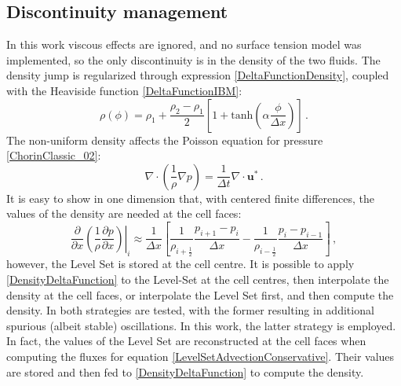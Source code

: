 \documentclass[11pt, a4paper, oneside, openany]{book}
\begin{document}
\subsection{Discontinuity management}
In this work viscous effects are ignored, and no surface tension model was implemented, so the only discontinuity is in the density of the two fluids. The density jump is regularized through expression \eqref{DeltaFunctionDensity}, coupled with the Heaviside function \eqref{DeltaFunctionIBM}:
\begin{equation}
\rho\left(\phi\right)=\rho_{1}+\dfrac{\rho_{2}-\rho_{1}}{2}\left[1+\mathrm{tanh}\left(\alpha\dfrac{\phi}{\Delta x}\right)\right]\,.\label{DensityDeltaFunction}
\end{equation}
The non-uniform density affects the Poisson equation for pressure \eqref{ChorinClassic_02}:
\begin{equation}
	\nabla\cdot\left(\dfrac{1}{\rho}\nabla p\right)=\frac{1}{\Delta t}\nabla\cdot\boldsymbol{u}^{*}\,.\label{PoissonPressureVarDensity}
\end{equation}
It is easy to show in one dimension that, with centered finite differences, the values of the density are needed at the cell faces:
\begin{equation*}
	\left.\dfrac{\partial}{\partial x}\left(\dfrac{1}{\rho}\dfrac{\partial p}{\partial x}\right)\right|_{i}\approx\dfrac{1}{\Delta x}\left[\dfrac{1}{\rho_{i+\frac{1}{2}}}\dfrac{p_{i+1}-p_{i}}{\Delta x}-\dfrac{1}{\rho_{i-\frac{1}{2}}}\dfrac{p_{i}-p_{i-1}}{\Delta x}\right]\,,
\end{equation*}
however, the Level Set is stored at the cell centre. It is possible to apply \eqref{DensityDeltaFunction} to the Level-Set at the cell centres, then interpolate the density at the cell faces, or interpolate the Level Set first, and then compute the density. In \cite {BIHS2016191} both strategies are tested, with the former resulting in additional spurious (albeit stable) oscillations. In this work, the latter strategy is employed. In fact, the values of the Level Set are reconstructed at the cell faces when computing the fluxes for equation \eqref{LevelSetAdvectionConservative}. Their values are stored and then fed to \eqref{DensityDeltaFunction} to compute the density.
\end{document}
